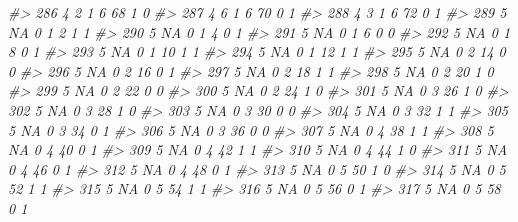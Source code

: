 \documentclass[]{book}
\newenvironment{Shaded}{\begin{snugshade}}{\end{snugshade}}
\newcommand{\CommentTok}[1]{\textcolor[rgb]{0.56,0.35,0.01}{\textit{#1}}}
\begin{document}
\begin{Shaded}
\begin{Highlighting}[]
\CommentTok{#> 286     4         2         1     6    68           1            0}
\CommentTok{#> 287     4         6         1     6    70           0            1}
\CommentTok{#> 288     4         3         1     6    72           0            1}
\CommentTok{#> 289     5        NA         0     1     2           1            1}
\CommentTok{#> 290     5        NA         0     1     4           0            1}
\CommentTok{#> 291     5        NA         0     1     6           0            0}
\CommentTok{#> 292     5        NA         0     1     8           0            1}
\CommentTok{#> 293     5        NA         0     1    10           1            1}
\CommentTok{#> 294     5        NA         0     1    12           1            1}
\CommentTok{#> 295     5        NA         0     2    14           0            0}
\CommentTok{#> 296     5        NA         0     2    16           0            1}
\CommentTok{#> 297     5        NA         0     2    18           1            1}
\CommentTok{#> 298     5        NA         0     2    20           1            0}
\CommentTok{#> 299     5        NA         0     2    22           0            0}
\CommentTok{#> 300     5        NA         0     2    24           1            0}
\CommentTok{#> 301     5        NA         0     3    26           1            0}
\CommentTok{#> 302     5        NA         0     3    28           1            0}
\CommentTok{#> 303     5        NA         0     3    30           0            0}
\CommentTok{#> 304     5        NA         0     3    32           1            1}
\CommentTok{#> 305     5        NA         0     3    34           0            1}
\CommentTok{#> 306     5        NA         0     3    36           0            0}
\CommentTok{#> 307     5        NA         0     4    38           1            1}
\CommentTok{#> 308     5        NA         0     4    40           0            1}
\CommentTok{#> 309     5        NA         0     4    42           1            1}
\CommentTok{#> 310     5        NA         0     4    44           1            0}
\CommentTok{#> 311     5        NA         0     4    46           0            1}
\CommentTok{#> 312     5        NA         0     4    48           0            1}
\CommentTok{#> 313     5        NA         0     5    50           1            0}
\CommentTok{#> 314     5        NA         0     5    52           1            1}
\CommentTok{#> 315     5        NA         0     5    54           1            1}
\CommentTok{#> 316     5        NA         0     5    56           0            1}
\CommentTok{#> 317     5        NA         0     5    58           0            1}

\end{Highlighting}
\end{Shaded}
\end{document}
